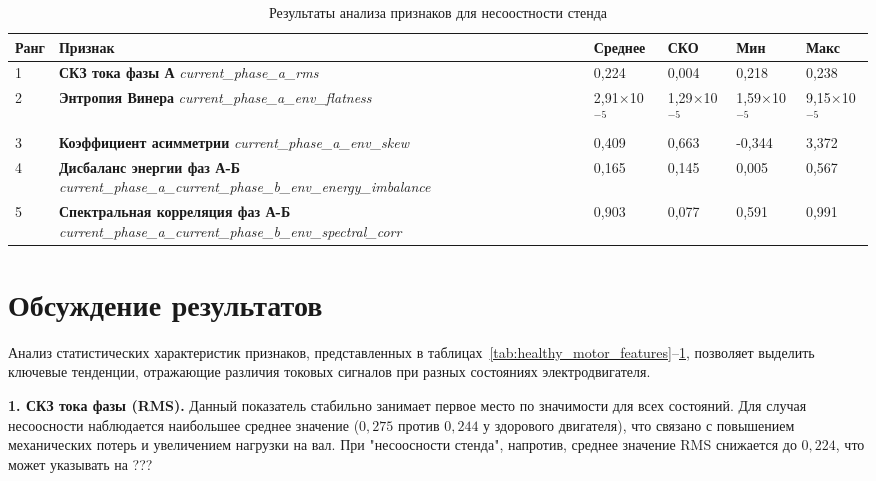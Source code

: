 \begin{table}[htbp]
\centering
\caption{Результаты анализа признаков для несоостности стенда}
\label{tab:system_misalignment_features}
\begin{tabular}{p{1cm} p{6cm} p{1.5cm} p{1.5cm} p{1.5cm} p{1.5cm}}
\toprule
\textbf{Ранг} & 
\textbf{Признак} &
\textbf{Среднее} & 
\textbf{СКО} &
\textbf{Мин} &
\textbf{Макс} \\
\midrule

1 & 
\textbf{СКЗ тока фазы А} \newline
\textit{current\_phase\_a\_rms} & 
0,224 & 0,004 & 0,218 & 0,238 \\
\midrule

2 & 
\textbf{Энтропия Винера} \newline
\textit{current\_phase\_a\_env\_flatness} & 
2,91$\times$10$^{-5}$ & 1,29$\times$10$^{-5}$ & 1,59$\times$10$^{-5}$ & 9,15$\times$10$^{-5}$ \\
\midrule

3 & 
\textbf{Коэффициент асимметрии} \newline
\textit{current\_phase\_a\_env\_skew} & 
0,409 & 0,663 & -0,344 & 3,372 \\
\midrule

4 & 
\textbf{Дисбаланс энергии фаз А-Б} \newline
\textit{current\_phase\_a\_current\_phase\_b\_env\_energy\_imbalance} & 
0,165 & 0,145 & 0,005 & 0,567 \\
\midrule

5 & 
\textbf{Спектральная корреляция фаз А-Б} \newline
\textit{current\_phase\_a\_current\_phase\_b\_env\_spectral\_corr} & 
0,903 & 0,077 & 0,591 & 0,991 \\

\bottomrule
\end{tabular}
\end{table}


\section*{Обсуждение результатов}

Анализ статистических характеристик признаков, представленных в таблицах~\ref{tab:healthy_motor_features}–\ref{tab:system_misalignment_features}, позволяет выделить ключевые тенденции, отражающие различия токовых сигналов при разных состояниях электродвигателя.

\textbf{1. СКЗ тока фазы (RMS).}
Данный показатель стабильно занимает первое место по значимости для всех состояний. 
Для случая несоосности наблюдается наибольшее среднее значение ($0{,}275$ против $0{,}244$ у здорового двигателя), что связано с повышением механических потерь и увеличением нагрузки на вал. 
При "несоосности стенда", напротив, среднее значение RMS снижается до $0{,}224$, что может указывать на ???


